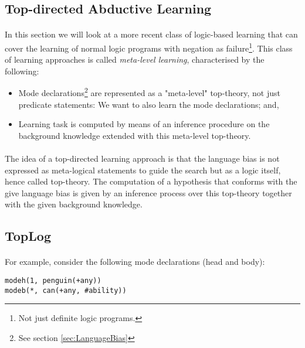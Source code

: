 \documentclass{article}
\theoremstyle{plain}
\theoremstyle{definition}
\begin{document}
\begin{multicols}{2}
\section{Top-directed Abductive Learning}

\paragraph{} In this section we will look at a more recent class of logic-based learning that can cover the learning of normal logic programs with negation as failure\footnote{Not just definite logic programs.}. This class of learning approaches is called \textit{meta-level learning}, characterised by the following:

\begin{itemize}
\item Mode declarations\footnote{See section \ref{sec:LanguageBias}} are represented as a "meta-level" top-theory, not just predicate statements: We want to also learn the mode declarations; and,
\item Learning task is computed by means of an inference procedure on the background knowledge extended with this meta-level top-theory.
\end{itemize}

\paragraph{} The idea of a top-directed learning approach is that the language bias is not expressed as meta-logical statements to guide the search but as a logic itself, hence called top-theory. The computation of a hypothesis that conforms with the give language bias is given by an inference process over this top-theory together with the given background knowledge.

\subsection{TopLog}

\paragraph{} For example, consider the following mode declarations (head and body):

\begin{lstlisting}
modeh(1, penguin(+any))
modeb(*, can(+any, #ability))
\end{lstlisting}


\end{multicols}
\end{document}
